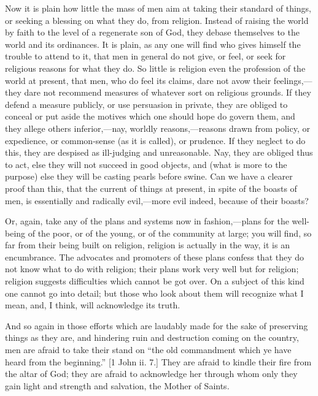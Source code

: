 Now it is plain how little the mass of men aim at taking their
standard of things, or seeking a blessing on what they do, from
religion. Instead of raising the world by faith to the level of a
regenerate son of God, they debase themselves to the world and its
ordinances. It is plain, as any one will find who gives himself the
trouble to attend to it, that men in general do not give, or feel, or
seek for religious reasons for what they do. So little is religion
even the profession of the world at present, that men, who do feel its
claims, dare not avow their feelings,—they dare not recommend
measures of whatever sort on religious grounds. If they defend a
measure publicly, or use persuasion in private, they are obliged to
conceal or put aside the motives which one should hope do govern them,
and they allege others inferior,—nay, worldly reasons,—reasons
drawn from policy, or expedience, or common-sense (as it is called),
or prudence. If they neglect to do this, they are despised as
ill-judging and unreasonable. Nay, they are obliged thus to act, else
they will not succeed in good objects, and (what is more to the
purpose) else they will be casting pearls before swine. Can we have a
clearer proof than this, that the current of things at present, in
spite of the boasts of men, is essentially and radically evil,—more
evil indeed, because of their boasts?

Or, again, take any of the plans and systems now in fashion,—plans
for the well-being of the poor, or of the young, or of the community
at large; you will find, so far from their being built on religion,
religion is actually in the way, it is an encumbrance. The advocates
and promoters of these plans confess that they do not know what to do
with religion; their plans work very well but for religion; religion
suggests difficulties which cannot be got over. On a subject of this
kind one cannot go into detail; but those who look about them will
recognize what I mean, and, I think, will acknowledge its truth.

And so again in those efforts which are laudably made for the sake
of preserving things as they are, and hindering ruin and destruction
coming on the country, men are afraid to take their stand on ``the
old commandment which ye have heard from the beginning.'' [1 John
ii. 7.] They are afraid to kindle their fire from the altar of God;
they are afraid to acknowledge her through whom only they gain light
and strength and salvation, the Mother of Saints.

